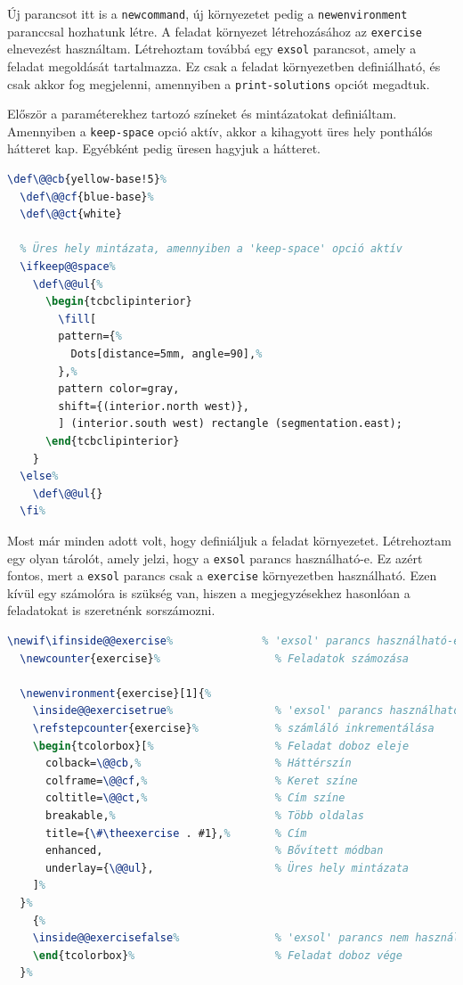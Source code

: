 Új parancsot itt is a \texttt{newcommand}, új környezetet pedig a
\texttt{newenvironment} paranccsal hozhatunk létre. A feladat környezet
létrehozásához az \texttt{exercise} elnevezést használtam. Létrehoztam továbbá
egy \texttt{exsol} parancsot, amely a feladat megoldását tartalmazza. Ez
csak a feladat környezetben definiálható, és csak akkor fog megjelenni,
amennyiben a \texttt{print-solutions} opciót megadtuk.

Először a paraméterekhez tartozó színeket és mintázatokat definiáltam.
Amennyiben a \texttt{keep-space} opció aktív, akkor a kihagyott üres hely
ponthálós hátteret kap. Egyébként pedig üresen hagyjuk a hátteret.

\begin{lstlisting}[language=tex,caption={Konstansok definiálása}]
  \def\@@cb{yellow-base!5}%
  \def\@@cf{blue-base}%
  \def\@@ct{white}

  % Üres hely mintázata, amennyiben a 'keep-space' opció aktív
  \ifkeep@@space%
    \def\@@ul{%
      \begin{tcbclipinterior}
        \fill[
        pattern={%
          Dots[distance=5mm, angle=90],%
        },%
        pattern color=gray,
        shift={(interior.north west)},
        ] (interior.south west) rectangle (segmentation.east);
      \end{tcbclipinterior}
    }
  \else%
    \def\@@ul{}
  \fi%
\end{lstlisting}

Most már minden adott volt, hogy definiáljuk a feladat környezetet. Létrehoztam
egy olyan tárolót, amely jelzi, hogy a \texttt{exsol} parancs használható-e.
Ez azért fontos, mert a \texttt{exsol} parancs csak a \texttt{exercise}
környezetben használható. Ezen kívül egy számolóra is szükség van, hiszen a
megjegyzésekhez hasonlóan a feladatokat is szeretnénk sorszámozni.

\begin{lstlisting}[language=tex,caption={Az \texttt{exercise} környezet}]
  \newif\ifinside@@exercise%              % 'exsol' parancs használható-e?
  \newcounter{exercise}%                  % Feladatok számozása

  \newenvironment{exercise}[1]{%
    \inside@@exercisetrue%                % 'exsol' parancs használható
    \refstepcounter{exercise}%            % számláló inkrementálása
    \begin{tcolorbox}[%                   % Feladat doboz eleje
      colback=\@@cb,%                     % Háttérszín
      colframe=\@@cf,%                    % Keret színe
      coltitle=\@@ct,%                    % Cím színe
      breakable,%                         % Több oldalas
      title={\#\theexercise . #1},%       % Cím
      enhanced,                           % Bővített módban
      underlay={\@@ul},                   % Üres hely mintázata
    ]%
  }%
	{%
    \inside@@exercisefalse%               % 'exsol' parancs nem használható
    \end{tcolorbox}%                      % Feladat doboz vége
  }%
\end{lstlisting}

